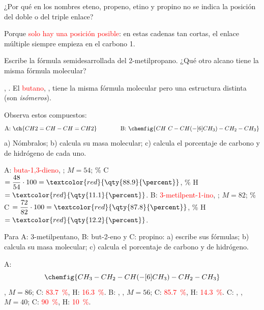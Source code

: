 \begin{exercise}
    ¿Por qué en los nombres eteno, propeno, etino y propino no se indica la posición del doble o del triple enlace?
    \begin{solu}
        Porque \textcolor{red}{solo hay una posición posible}: en estas cadenas tan cortas, el enlace múltiple siempre empieza en el carbono 1.
    \end{solu}
\end{exercise}

\begin{exercise}
    Escribe la fórmula semidesarrollada del 2-metilpropano. ¿Qué otro alcano tiene la misma fórmula molecular?
    \begin{solu}
        \textcolor{red}{}, . El \textcolor{red}{butano}, , tiene la misma fórmula molecular pero una estructura distinta (son \emph{isómeros}).
    \end{solu}
\end{exercise}

\begin{exercise}
    Observa estos compuestos:
    \[ \text{A:}\ \ch{CH2=CH-CH=CH2} \qquad\qquad \text{B:}\ \chemfig{CH~C-CH(-[6]CH_3)-CH_2-CH_3} \]
    a) Nómbralos; b) calcula su masa molecular; c) calcula el porcentaje de carbono y de hidrógeno de cada uno.
    \begin{solu}
        A: \textcolor{red}{buta-1,3-dieno}, ; \(M = 54\); \% C \(= \dfrac{48}{54} \cdot 100 = \textcolor{red}{\qty{88.9}{\percent}}\), \% H \(= \textcolor{red}{\qty{11.1}{\percent}}\).
        B: \textcolor{red}{3-metilpent-1-ino}, ; \(M = 82\); \% C \(= \dfrac{72}{82} \cdot 100 = \textcolor{red}{\qty{87.8}{\percent}}\), \% H \(= \textcolor{red}{\qty{12.2}{\percent}}\).
    \end{solu}
\end{exercise}

\begin{exercise}
    Para A: 3-metilpentano, B: but-2-eno y C: propino: a) escribe sus fórmulas; b) calcula su masa molecular; c) calcula el porcentaje de carbono y de hidrógeno.
    \begin{solu}
        A: \[ \chemfig{CH_3-CH_2-CH(-[6]CH_3)-CH_2-CH_3} \] , \(M = 86\); C: \textcolor{red}{\qty{83.7}{\percent}}, H: \textcolor{red}{\qty{16.3}{\percent}}.
        B: , , \(M = 56\); C: \textcolor{red}{\qty{85.7}{\percent}}, H: \textcolor{red}{\qty{14.3}{\percent}}.
        C: , , \(M = 40\); C: \textcolor{red}{\qty{90}{\percent}}, H: \textcolor{red}{\qty{10}{\percent}}.
    \end{solu}
\end{exercise}

